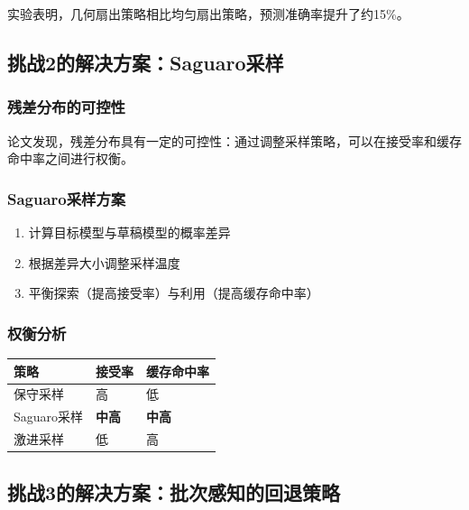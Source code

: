 \documentclass[11pt,a4paper]{article}
\newcommand{\tableheadercolor}{\rowcolor{primaryblue!15}}
\begin{document}
实验表明，几何扇出策略相比均匀扇出策略，预测准确率提升了约15\%。

\subsection{挑战2的解决方案：Saguaro采样}

\subsubsection{残差分布的可控性}

论文发现，残差分布具有一定的可控性：通过调整采样策略，可以在接受率和缓存命中率之间进行权衡。

\subsubsection{Saguaro采样方案}

\begin{innovationbox}[Saguaro采样]
  \begin{enumerate}
    \item 计算目标模型与草稿模型的概率差异
    \item 根据差异大小调整采样温度
    \item 平衡探索（提高接受率）与利用（提高缓存命中率）
  \end{enumerate}
\end{innovationbox}

\subsubsection{权衡分析}

\begin{center}
\begin{tabular}{>{\raggedright}p{3cm} >{\centering}p{3cm} >{\centering\arraybackslash}p{3cm}}
  \toprule
  \tableheadercolor
  \textbf{策略} & \textbf{接受率} & \textbf{缓存命中率} \\
  \midrule
  保守采样 & 高 & 低 \\
  \rowcolor{bggreen}
  Saguaro采样 & \textbf{中高} & \textbf{中高} \\
  激进采样 & 低 & 高 \\
  \bottomrule
\end{tabular}
\end{center}

\subsection{挑战3的解决方案：批次感知的回退策略}
\end{document}
